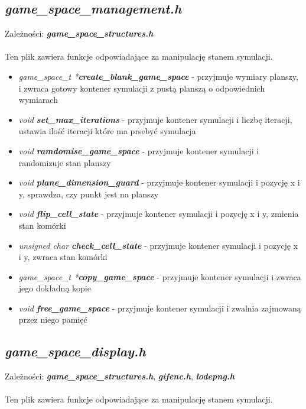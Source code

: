 \documentclass[12pt]{article}
\begin{document}
    \subsection{\textbf{\textit{game\_space\_management.h}}}
        Zależności: \textit{ \textbf{game\_space\_structures.h}}\\\\
        Ten plik zawiera funkcje odpowiadające za manipulację stanem symulacji.

        \begin{itemize}
            \item \textit{game\_space\_t *\textbf{create\_blank\_game\_space}} - przyjmuje wymiary planszy, i zwraca gotowy kontener symulacji z pustą planszą o odpowiednich wymiarach
            \item \textit{void \textbf{set\_max\_iterations}} - przyjmuje kontener symulacji i liczbę iteracji, ustawia ilość iteracji które ma prsebyć symulacja
            \item \textit{void \textbf{ramdomise\_game\_space}} - przyjmuje kontener symulacji i randomizuje stan planszy
            \item \textit{void \textbf{plane\_dimension\_guard}} - przyjmuje kontener symulacji i pozycję x i y, sprawdza, czy punkt jest na planszy
            \item \textit{void \textbf{flip\_cell\_state}} - przyjmuje kontener symulacji i pozycję x i y, zmienia stan komórki
            \item \textit{unsigned char \textbf{check\_cell\_state}} - przyjmuje kontener symulacji i pozycję x i y, zwraca stan komórki
            \item \textit{game\_space\_t *\textbf{copy\_game\_space}} - przyjmuje kontener symulacji i zwraca jego dokładną kopie
            \item \textit{void \textbf{free\_game\_space}} - przyjmuje kontener symulacji i zwalnia zajmowaną przez niego pamięć
        \end{itemize}


    \subsection{\textbf{\textit{game\_space\_display.h}}}
        Zależności: \textit{ \textbf{game\_space\_structures.h}}, \textit{ \textbf{gifenc.h}}, \textit{ \textbf{lodepng.h}}\\\\
        Ten plik zawiera funkcje odpowiadające za manipulację stanem symulacji.
\end{document}
